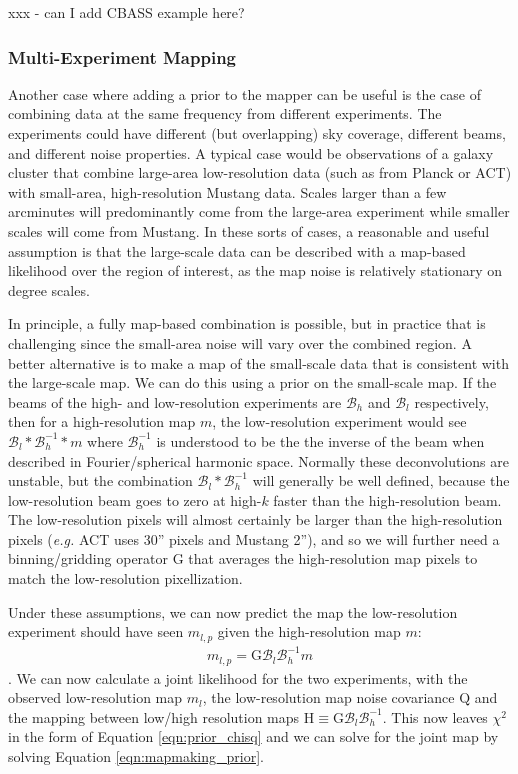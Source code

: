 \documentclass[12]{article}
\begin{document}
xxx - can I add CBASS example here?

\subsubsection{Multi-Experiment Mapping}

Another case where adding a prior to the mapper can be useful is the
case of combining data at the same frequency from different
experiments.  The experiments could have different (but overlapping)
sky coverage, different beams, and different noise properties.  A
typical case would be observations of a galaxy cluster that combine
large-area low-resolution data (such as from Planck or ACT) with
small-area, high-resolution Mustang data.  Scales larger than a few
arcminutes will predominantly come from the large-area experiment
while smaller scales will come from Mustang.  In these sorts of cases,
a reasonable and useful assumption is that the large-scale data can be
described with a map-based likelihood over the region of interest, as
the map noise is relatively stationary on degree scales.  

In principle, a fully map-based combination is possible, but in
practice that is challenging since the small-area noise will vary over
the combined region.  A better alternative is to make a map of the
small-scale data that is consistent with the large-scale map.  We can
do this using a prior on the small-scale map.  If the beams of the
high- and low-resolution experiments are $\mathcal{B}_h$ and
$\mathcal{B}_l$ respectively, then for a high-resolution map $m$, the
low-resolution experiment would see $\mathcal{B}_l \ast
\mathcal{B}_h^{-1} \ast m$ where $\mathcal{B}_h^{-1}$ is understood to
be the the inverse of the beam when described in Fourier/spherical
harmonic space.  Normally these deconvolutions are unstable, but the
combination $\mathcal{B}_l \ast \mathcal{B}_h^{-1}$ will generally be
well defined, because the low-resolution beam goes to zero at high-$k$
faster than the high-resolution beam.  The low-resolution pixels will
almost certainly be larger than the high-resolution pixels
(\textit{e.g.} ACT uses 30'' pixels and Mustang 2''), and so we will
further need a binning/gridding operator $\mathrm{G}$ that averages
the high-resolution map pixels to match the low-resolution
pixellization.  

Under these assumptions, we can now predict the map the low-resolution
experiment should have seen $m_{l,p}$ given the high-resolution map
$m$:
\begin{eqnarray}
m_{l,p}=\mathrm{G} \mathcal{B}_l \mathcal{B}_h^{-1} m
\end{eqnarray}
.  We can now calculate a joint likelihood for the two experiments,
with the observed low-resolution map $m_l$, the low-resolution map
noise covariance $\mathrm{Q}$ and the mapping between low/high
resolution maps $\mathrm{H} \equiv \mathrm{G} \mathcal{B}_l
\mathcal{B}_h^{-1}$.  This now leaves $\chi^2$ in the form of Equation
\ref{eqn:prior_chisq} and we can solve for the joint map by solving
Equation \ref{eqn:mapmaking_prior}.  
\end{document}
